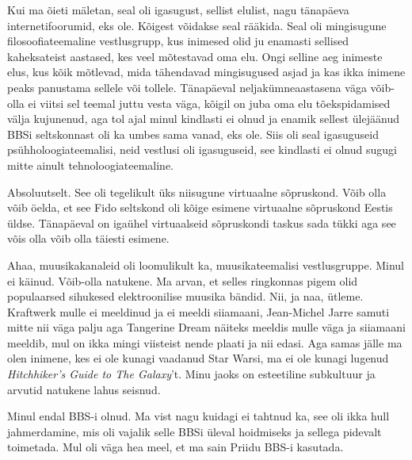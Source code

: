 Kui ma õieti mäletan, seal oli igasugust, sellist elulist, nagu tänapäeva 
internetifoorumid, eks ole. Kõigest võidakse seal rääkida. Seal oli mingisugune 
filosoofiateemaline  vestlusgrupp, kus  inimesed olid ju enamasti sellised 
kaheksateist aastased, kes veel mõtestavad oma elu. Ongi selline aeg inimeste 
elus, kus kõik mõtlevad, mida tähendavad mingisugused asjad ja kas ikka inimene 
peaks panustama sellele või tollele. Tänapäeval neljakümneaastasena väga 
võib-olla ei viitsi sel teemal juttu vesta väga, kõigil on juba oma elu 
tõekspidamised välja kujunenud, aga tol ajal minul kindlasti ei olnud ja enamik 
sellest ülejäänud BBSi seltskonnast oli ka umbes sama vanad, eks ole. Siis oli 
seal igasuguseid psühholoogiateemalisi, neid vestlusi oli igasuguseid, see 
kindlasti ei olnud sugugi mitte ainult tehnoloogiateemaline. 


Absoluutselt. See oli tegelikult üks niisugune virtuaalne sõpruskond.  Võib 
olla võib öelda, et see Fido seltskond oli kõige esimene virtuaalne sõpruskond 
Eestis üldse. Tänapäeval on  igaühel virtuaalseid sõpruskondi taskus sada tükki 
aga see võis olla võib olla täiesti esimene.


Ahaa, muusikakanaleid oli loomulikult ka, muusikateemalisi  vestlusgruppe. 
Minul ei käinud. Võib-olla natukene. Ma arvan, et  selles ringkonnas pigem olid 
populaarsed sihukesed elektroonilise muusika bändid. Nii, ja naa, ütleme. 
Kraftwerk mulle ei meeldinud ja ei meeldi siiamaani, Jean-Michel Jarre samuti 
mitte nii väga palju aga Tangerine Dream näiteks meeldis mulle väga ja 
siiamaani meeldib, mul on ikka mingi viisteist nende plaati ja nii edasi. Aga 
samas jälle ma olen inimene, kes ei ole kunagi vaadanud Star Warsi, ma ei ole 
kunagi lugenud \emph{Hitchhiker's Guide to The Galaxy}'t. Minu jaoks  on 
esteetiline subkultuur ja arvutid natukene lahus seisnud.


Minul endal BBS-i olnud. Ma vist nagu kuidagi ei tahtnud ka, see oli ikka hull 
jahmerdamine, mis oli vajalik selle BBSi üleval hoidmiseks ja sellega pidevalt 
toimetada. Mul oli väga hea meel, et ma sain  Priidu BBS-i kasutada.

